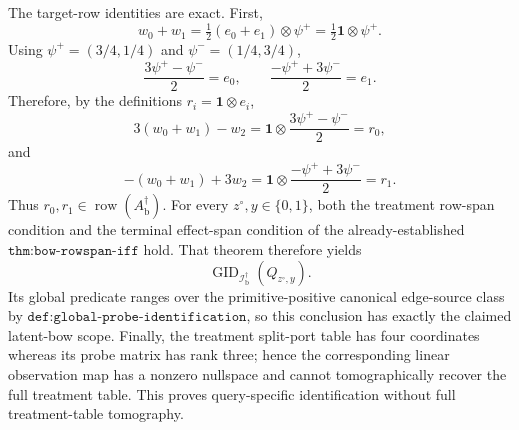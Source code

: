 The target-row identities are exact.  First,
\[
 w_0+w_1
 =\tfrac12(e_0+e_1)\otimes\psi^{+}
 =\tfrac12\mathbf 1\otimes\psi^{+}.
\]
Using \(\psi^{+}=(3/4,1/4)\) and \(\psi^{-}=(1/4,3/4)\),
\[
 \frac{3\psi^{+}-\psi^{-}}2=e_0,
 \qquad
 \frac{-\psi^{+}+3\psi^{-}}2=e_1.
\]
Therefore, by the definitions \(r_i=\mathbf 1\otimes e_i\),
\[
 3(w_0+w_1)-w_2
 =\mathbf 1\otimes\frac{3\psi^{+}-\psi^{-}}2
 =r_0,
\]
and
\[
 -(w_0+w_1)+3w_2
 =\mathbf 1\otimes\frac{-\psi^{+}+3\psi^{-}}2
 =r_1.
\]
Thus \(r_0,r_1\in\operatorname{row}(A_{\mathrm b}^{\dagger})\).  For every \(z^{\circ},y\in\{0,1\}\), both the treatment row-span condition and the terminal effect-span condition of the already-established \(\texttt{thm:bow-rowspan-iff}\) hold.  That theorem therefore yields
\[
 \operatorname{GID}_{\mathcal I_{\mathrm b}^{\dagger}}(Q_{z^{\circ},y}).
\]
Its global predicate ranges over the primitive-positive canonical edge-source class by \(\texttt{def:global-probe-identification}\), so this conclusion has exactly the claimed latent-bow scope.  Finally, the treatment split-port table has four coordinates whereas its probe matrix has rank three; hence the corresponding linear observation map has a nonzero nullspace and cannot tomographically recover the full treatment table.  This proves query-specific identification without full treatment-table tomography.